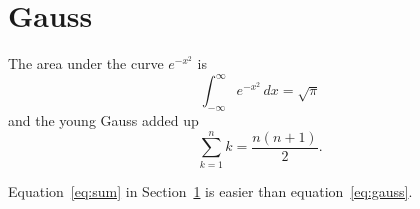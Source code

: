 \documentclass{article}
\begin{document}
\section{Gauss}\label{sec:gauss}
The area under the curve $e^{-x^2}$ is
\begin{equation}\label{eq:gauss}
  \int_{-\infty}^{\infty} e^{-x^2}\,dx = \sqrt{\pi}
\end{equation}
and the young Gauss added up
\begin{equation}\label{eq:sum}
  \sum_{k=1}^{n} k = \frac{n(n+1)}{2}.
\end{equation}

Equation~\ref{eq:sum} in Section~\ref{sec:gauss}
is easier than equation~\ref{eq:gauss}.
\end{document}
